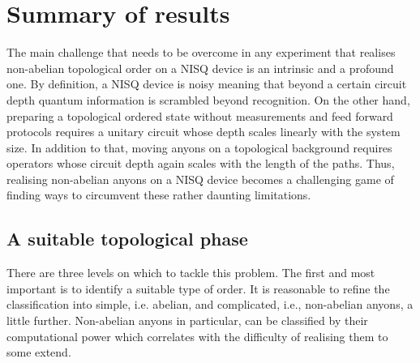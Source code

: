\documentclass[two column]{article}
\begin{document}
\section{Summary of results}\label{sec:summary_intro}
The main challenge that needs to be overcome in any experiment that realises non-abelian topological order on a NISQ device is an intrinsic and a profound one. By definition, a NISQ device is noisy meaning that beyond a certain circuit depth quantum information is scrambled beyond recognition. On the other hand, preparing a topological ordered state without measurements and feed forward protocols requires a unitary circuit whose depth scales linearly with the system size. In addition to that, moving anyons on a topological background requires operators whose circuit depth again scales with the length of the paths. Thus, realising non-abelian anyons on a NISQ device becomes a challenging game of finding ways to circumvent these rather daunting limitations. 

\subsection{A suitable topological phase}

There are three levels on which to tackle this problem. The first and most important is to identify a suitable type of order. It is reasonable to refine the classification into simple, i.e. abelian, and complicated, i.e., non-abelian anyons, a little further. Non-abelian anyons in particular, can be classified by their computational power which correlates with the difficulty of realising them to some extend. 
\end{document}
